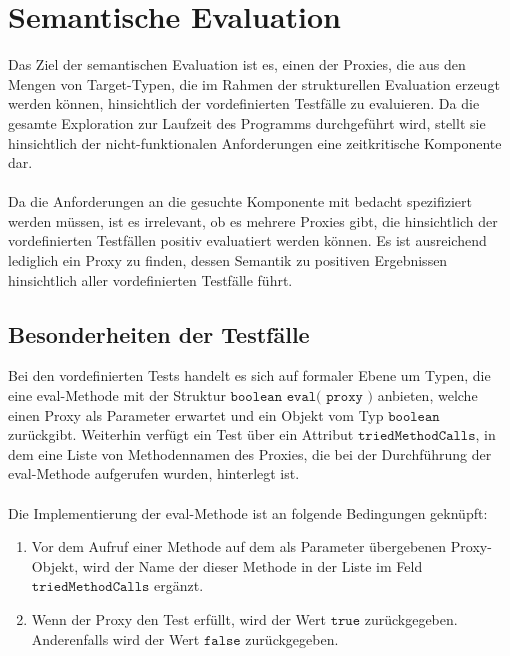 \section{Semantische Evaluation}
Das Ziel der semantischen Evaluation ist es, einen der Proxies, die aus den Mengen von Target-Typen, die im Rahmen der strukturellen Evaluation erzeugt werden können, hinsichtlich der vordefinierten Testfälle zu evaluieren. Da die gesamte Exploration zur Laufzeit des Programms durchgeführt wird, stellt sie hinsichtlich der nicht-funktionalen Anforderungen eine zeitkritische Komponente dar.
\\\\
Da die Anforderungen an die gesuchte Komponente mit bedacht spezifiziert werden müssen, ist es irrelevant, ob es mehrere Proxies gibt, die hinsichtlich der vordefinierten Testfällen positiv evaluatiert werden können. Es ist ausreichend lediglich ein Proxy zu finden, dessen Semantik zu positiven Ergebnissen hinsichtlich aller vordefinierten Testfälle führt.
\subsection{Besonderheiten der Testfälle}
Bei den vordefinierten Tests handelt es sich auf formaler Ebene um Typen, die eine eval-Methode mit der Struktur $\texttt{boolean eval( proxy )}$ anbieten, welche einen Proxy als Parameter erwartet und ein Objekt vom Typ $\texttt{boolean}$ zurückgibt. Weiterhin verfügt ein Test über ein Attribut $\texttt{triedMethodCalls}$, in dem eine Liste von Methodennamen des Proxies, die bei der Durchführung der eval-Methode aufgerufen wurden, hinterlegt ist.
\\\\
Die Implementierung der eval-Methode ist an folgende Bedingungen geknüpft:
\begin{enumerate}
\item Vor dem Aufruf einer Methode auf dem als Parameter übergebenen Proxy-Objekt, wird der Name der dieser Methode in der Liste im Feld $\texttt{triedMethodCalls}$ ergänzt.
\item Wenn der Proxy den Test erfüllt, wird der Wert $\texttt{true}$ zurückgegeben. Anderenfalls wird der Wert $\texttt{false}$ zurückgegeben.
\end{enumerate}

